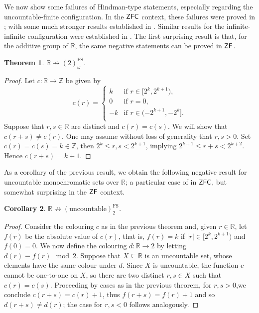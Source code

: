 \documentclass{amsart}
\newtheorem{theorem}{Theorem}[section]
\newtheorem{corollary}[theorem]{Corollary}
\theoremstyle{definition}
\newcommand{\zf}{\mathnormal{\mathsf{ZF}}}
\newcommand{\zfc}{\mathnormal{\mathsf{ZFC}}}
\theoremstyle{remark}
\numberwithin{equation}{section}
\begin{document}
We now show some failures of Hindman-type statements, especially regarding the uncountable-finite configuration. In the $\zfc$ context, these failures were proved in \cite{Fernandez2018}; with some much stronger results established in \cite{FernandezRinot2017}. Similar results for the infinite-infinite configuration were established in \cite[Theorem 12]{FernandezLee2020}. The first surprising result is that, for the additive group of  $\mathbb R$, the same negative statements can be proved in $\zf$.

\begin{theorem}\label{thm:hindman-R-fails}
$\mathbb{R}\not\to(2)^{\operatorname{FS}}_{\omega}$.
\end{theorem}

    \begin{proof}
        Let $c:\mathbb{R}\longrightarrow\mathbb{Z}$ be given by
        \begin{equation*}
            c(r)=\begin{cases}
                k&\text{if }r\in[2^{k},2^{k+1}),\\
                0&\text{if }r=0,\\
                -k&\text{if }r\in(-2^{k+1},-2^{k}].\\
            \end{cases}
        \end{equation*}
        Suppose that $r,s\in\mathbb{R}$ are distinct and $c(r)=c(s)$. We will show that $c(r+s)\neq c(r)$. One may assume without loss of generality that $r,s>0$. Set $c(r)=c(s)=k\in\mathbb{Z}$, then $2^{k}\leq r,s<2^{k+1}$, implying $2^{k+1}\leq r+s<2^{k+2}$. Hence $c(r+s)=k+1$.
    \end{proof}

As a corollary of the previous result, we obtain the following negative result for uncountable monochromatic sets over $\mathbb R$; a particular case of \cite[Theorem 5]{Fernandez2018} in $\zfc$, but somewhat surprising in the $\zf$ context.

\begin{corollary}\label{hindman-on-R-is-countable}    $\mathbb{R}\not\to(\mathrm{uncountable})^{\operatorname{FS}}_{2}$.
\end{corollary}

\begin{proof}
    Consider the colouring $c$ as in the previous theorem and, given $r\in\mathbb R$, let $f(r)$ be the absolute value of $c(r)$, that is, $f(r)=k$ if $|r|\in[2^{k},2^{k+1})$ and $f(0)=0$. We now define the colouring $d:\mathbb R\longrightarrow 2$ by letting $d(r)\equiv f(r)\mod 2$. Suppose that $X\subseteq\mathbb R$ is an uncountable set, whose elements have the same colour under $d$. Since $X$ is uncountable, the  function $c$ cannot be one-to-one on $X$, so there are two distinct $r,s\in X$ such that $c(r)=c(s)$. Proceeding by cases as in the previous theorem, for $r,s>0$,\linebreak we conclude $c(r+s)=c(r)+1$, thus $f(r+s)=f(r)+1$ and so $d(r+s)\neq d(r)$; the case for $r,s<0$ follows analogously.
\end{proof}
\end{document}
